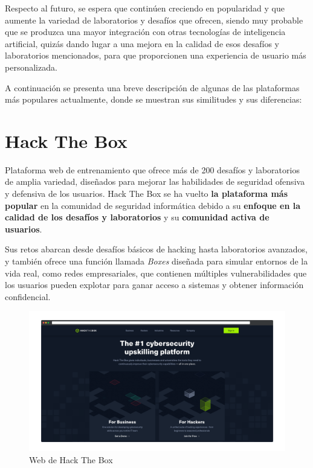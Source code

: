     Respecto al futuro, se espera que continúen creciendo en popularidad y que aumente la variedad de laboratorios y desafíos que ofrecen, siendo muy probable que se produzca una mayor integración con otras tecnologías de inteligencia artificial, quizás dando lugar a una mejora en la calidad de esos desafíos y laboratorios mencionados, para que proporcionen una experiencia de usuario más personalizada.
    
    A continuación se presenta una breve descripción de algunas de las plataformas más populares actualmente, donde se muestran sus similitudes y sus diferencias:
    
    \newpage
    
    
    \section{Hack The Box}
    
    Plataforma web de entrenamiento que ofrece más de 200 desafíos y laboratorios de amplia variedad, diseñados para mejorar las habilidades de seguridad ofensiva y defensiva de los usuarios. Hack The Box se ha vuelto \textbf{la plataforma más popular} en la comunidad de seguridad informática debido a su \textbf{enfoque en la calidad de los desafíos y laboratorios} y su \textbf{comunidad activa de usuarios}.
    
    Sus retos abarcan desde desafíos básicos de hacking hasta laboratorios avanzados, y también ofrece una función llamada \textit{Boxes} diseñada para simular entornos de la vida real, como redes empresariales, que contienen múltiples vulnerabilidades que los usuarios pueden explotar para ganar acceso a sistemas y obtener información confidencial.
    
    \begin{figure}[h]
        \centering
        \includegraphics[width=\textwidth]{images/Capturas/Web de HTB.png}
        \caption{Web de Hack The Box}
        \label{fig:HTB-web}
    \end{figure}
    
